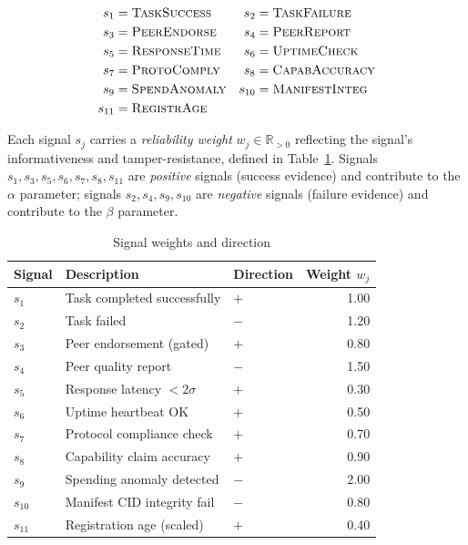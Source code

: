 \documentclass[conference]{IEEEtran}
\begin{document}
\begin{align*}
s_1  &= \textsc{TaskSuccess}    & s_2  &= \textsc{TaskFailure} \\
s_3  &= \textsc{PeerEndorse}    & s_4  &= \textsc{PeerReport} \\
s_5  &= \textsc{ResponseTime}   & s_6  &= \textsc{UptimeCheck} \\
s_7  &= \textsc{ProtoComply}    & s_8  &= \textsc{CapabAccuracy} \\
s_9  &= \textsc{SpendAnomaly}   & s_{10} &= \textsc{ManifestInteg} \\
s_{11} &= \textsc{RegistrAge}
\end{align*}

Each signal $s_j$ carries a \emph{reliability weight}
$w_j \in \mathbb{R}_{>0}$ reflecting the signal's
informativeness and tamper-resistance, defined in
Table~\ref{tab:signals}. Signals $s_1, s_3, s_5, s_6, s_7,
s_8, s_{11}$ are \emph{positive} signals (success evidence)
and contribute to the $\alpha$ parameter; signals $s_2, s_4,
s_9, s_{10}$ are \emph{negative} signals (failure evidence)
and contribute to the $\beta$ parameter.

\begin{table}[t]
\centering
\caption{Signal weights and direction}
\label{tab:signals}
\begin{tabular}{lllr}
\toprule
Signal & Description & Direction & Weight $w_j$ \\
\midrule
$s_1$  & Task completed successfully    & $+$ & 1.00 \\
$s_2$  & Task failed                    & $-$ & 1.20 \\
$s_3$  & Peer endorsement (gated)       & $+$ & 0.80 \\
$s_4$  & Peer quality report            & $-$ & 1.50 \\
$s_5$  & Response latency $< 2\sigma$   & $+$ & 0.30 \\
$s_6$  & Uptime heartbeat OK            & $+$ & 0.50 \\
$s_7$  & Protocol compliance check      & $+$ & 0.70 \\
$s_8$  & Capability claim accuracy      & $+$ & 0.90 \\
$s_9$  & Spending anomaly detected      & $-$ & 2.00 \\
$s_{10}$ & Manifest CID integrity fail  & $-$ & 0.80 \\
$s_{11}$ & Registration age (scaled)    & $+$ & 0.40 \\
\bottomrule
\end{tabular}
\end{table}
\end{document}
